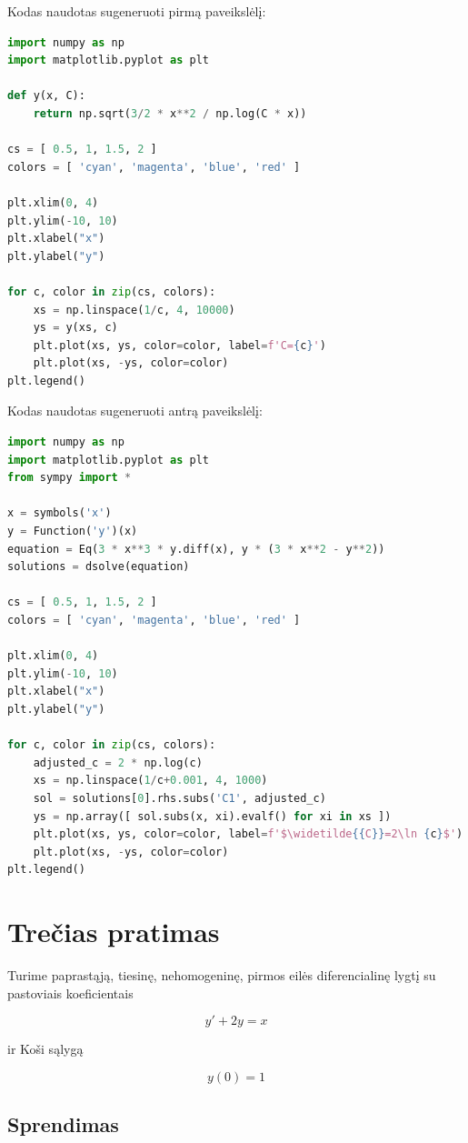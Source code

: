 \documentclass[11pt]{article}
\begin{document}
\newpage
Kodas naudotas sugeneruoti pirmą paveikslėlį:

\begin{lstlisting}[language=Python]
import numpy as np
import matplotlib.pyplot as plt

def y(x, C):
    return np.sqrt(3/2 * x**2 / np.log(C * x))

cs = [ 0.5, 1, 1.5, 2 ]
colors = [ 'cyan', 'magenta', 'blue', 'red' ]

plt.xlim(0, 4)
plt.ylim(-10, 10)
plt.xlabel("x")
plt.ylabel("y")

for c, color in zip(cs, colors):
    xs = np.linspace(1/c, 4, 10000)
    ys = y(xs, c)
    plt.plot(xs, ys, color=color, label=f'C={c}')
    plt.plot(xs, -ys, color=color)
plt.legend()
\end{lstlisting}

\newpage
Kodas naudotas sugeneruoti antrą paveikslėlį:

\begin{lstlisting}[language=Python]
import numpy as np
import matplotlib.pyplot as plt
from sympy import * 

x = symbols('x')
y = Function('y')(x)
equation = Eq(3 * x**3 * y.diff(x), y * (3 * x**2 - y**2))
solutions = dsolve(equation)

cs = [ 0.5, 1, 1.5, 2 ]
colors = [ 'cyan', 'magenta', 'blue', 'red' ]

plt.xlim(0, 4)
plt.ylim(-10, 10)
plt.xlabel("x")
plt.ylabel("y")

for c, color in zip(cs, colors):
    adjusted_c = 2 * np.log(c)
    xs = np.linspace(1/c+0.001, 4, 1000)
    sol = solutions[0].rhs.subs('C1', adjusted_c)
    ys = np.array([ sol.subs(x, xi).evalf() for xi in xs ])
    plt.plot(xs, ys, color=color, label=f'$\widetilde{{C}}=2\ln {c}$')
    plt.plot(xs, -ys, color=color)
plt.legend()
\end{lstlisting}

\newpage
\section{Trečias pratimas}

Turime paprastąją, tiesinę, nehomogeninę, pirmos eilės diferencialinę lygtį su pastoviais koeficientais

$$y'+2y=x$$

ir Koši sąlygą

$$y(0)=1$$

\subsection{Sprendimas}
\end{document}
